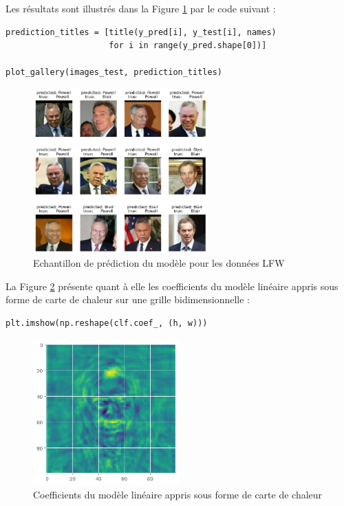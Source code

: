 \documentclass{scrartcl}
\begin{document}
Les résultats sont illustrés dans la Figure \ref{fig:prediction} par le code suivant :

\begin{lstlisting}
prediction_titles = [title(y_pred[i], y_test[i], names)
                     for i in range(y_pred.shape[0])]

plot_gallery(images_test, prediction_titles)
\end{lstlisting}

\begin{figure}[H]
    \centering
    \includegraphics[width=0.6\textwidth]{../images/TB-CPpred.png}
    \caption{\centering Echantillon de prédiction du modèle pour les données LFW} 
    \label{fig:prediction}
\end{figure}

La Figure \ref{fig:cc} présente quant à elle les coefficients du modèle linéaire appris sous forme de carte de chaleur sur une grille bidimensionnelle :

\begin{lstlisting}
plt.imshow(np.reshape(clf.coef_, (h, w)))
\end{lstlisting}

\begin{figure}[H]
    \centering
    \includegraphics[width=0.5\textwidth]{../images/cc.png}
    \caption{\centering Coefficients du modèle linéaire appris sous forme de carte de chaleur} 
    \label{fig:cc}
\end{figure}
\end{document}
